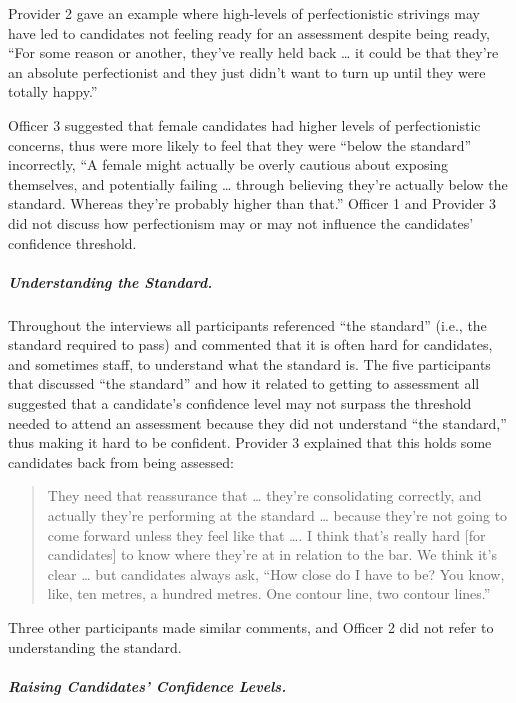 \documentclass[
  12pt,
  a4paper,
]{book}
\begin{document}
Provider 2 gave an example where high-levels of perfectionistic strivings may have led to candidates not feeling ready for an assessment despite being ready, ``For some reason or another, they've really held back \ldots{} it could be that they're an absolute perfectionist and they just didn't want to turn up until they were totally happy.''

Officer 3 suggested that female candidates had higher levels of perfectionistic concerns, thus were more likely to feel that they were ``below the standard'' incorrectly, ``A female might actually be overly cautious about exposing themselves, and potentially failing \ldots{} through believing they're actually below the standard. Whereas they're probably higher than that.'' Officer 1 and Provider 3 did not discuss how perfectionism may or may not influence the candidates' confidence threshold.

\hypertarget{ml-qualitative-gta-understanding-the-standard}{%
\subparagraph{Understanding the Standard.}\label{ml-qualitative-gta-understanding-the-standard}}

Throughout the interviews all participants referenced ``the standard'' (i.e., the standard required to pass) and commented that it is often hard for candidates, and sometimes staff, to understand what the standard is. The five participants that discussed ``the standard'' and how it related to getting to assessment all suggested that a candidate's confidence level may not surpass the threshold needed to attend an assessment because they did not understand ``the standard,'' thus making it hard to be confident. Provider 3 explained that this holds some candidates back from being assessed:

\begin{quote}
They need that reassurance that \ldots{} they're consolidating correctly, and actually they're performing at the standard \ldots{} because they're not going to come forward unless they feel like that \ldots. I think that's really hard {[}for candidates{]} to know where they're at in relation to the bar. We think it's clear \ldots{} but candidates always ask, ``How close do I have to be? You know, like, ten metres, a hundred metres. One contour line, two contour lines.''
\end{quote}

Three other participants made similar comments, and Officer 2 did not refer to understanding the standard.

\hypertarget{raising-candidates-confidence-levels.}{%
\subparagraph{Raising Candidates' Confidence Levels.}\label{raising-candidates-confidence-levels.}}
\end{document}
